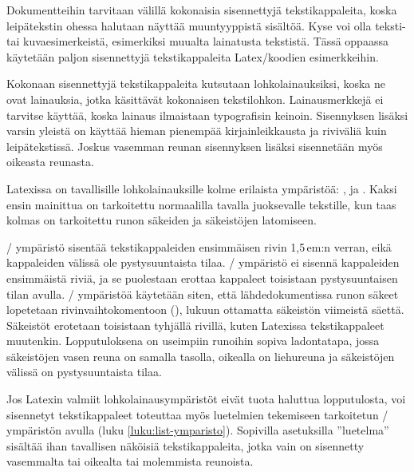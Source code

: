 Dokumentteihin tarvitaan välillä kokonaisia sisennettyjä
tekstikappaleita, koska leipätekstin ohessa halutaan näyttää
muuntyyppistä sisältöä. Kyse voi olla teksti- tai kuvaesimerkeistä,
esimerkiksi muualta lainatusta tekstistä. Tässä oppaassa käytetään
paljon sisennettyjä tekstikappaleita Latex\-/koodien esimerkkeihin.

Kokonaan sisennettyjä tekstikappaleita kutsutaan lohkolainauksiksi,
koska ne ovat lainauksia, jotka käsittävät kokonaisen tekstilohkon.
Lainausmerkkejä ei tarvitse käyttää, koska lainaus ilmaistaan
typografisin keinoin. Sisennyksen lisäksi varsin yleistä on käyttää
hieman pienempää kirjainleikkausta ja riviväliä kuin leipätekstissä.
Joskus vasemman reunan sisennyksen lisäksi sisennetään myös oikeasta
reunasta.

Latexissa on tavallisille lohkolainauksille kolme erilaista ympäristöä:
,  ja . Kaksi
ensin mainittua on tarkoitettu normaalilla tavalla juoksevalle
tekstille, kun taas kolmas on tarkoitettu runon säkeiden ja säkeistöjen
latomiseen.

\-/ ympäristö sisentää tekstikappaleiden
ensimmäisen rivin 1,5\,em:n verran, eikä kappaleiden välissä ole
pystysuuntaista tilaa. \-/ ympäristö ei sisennä
kappaleiden ensimmäistä riviä, ja se puolestaan erottaa kappaleet
toisistaan pystysuuntaisen tilan avulla. \-/ ympäristöä
käytetään siten, että lähdedokumentissa runon säkeet lopetetaan
rivinvaihtokomentoon (\komento{\keno}), lukuun ottamatta säkeistön
viimeistä säettä. Säkeistöt erotetaan toisistaan tyhjällä rivillä, kuten
Latexissa tekstikappaleet muutenkin. Lopputuloksena on useimpiin
runoihin sopiva ladontatapa, jossa säkeistöjen vasen reuna on samalla
tasolla, oikealla on liehureuna ja säkeistöjen välissä on
pystysuuntaista tilaa.

Jos Latexin valmiit lohkolainausympäristöt eivät tuota haluttua
lopputulosta, voi sisennetyt tekstikappaleet toteuttaa myös luetelmien
tekemiseen tarkoitetun \-/ ympäristön avulla (luku
\ref{luku:list-ymparisto}). Sopivilla asetuksilla ''luetelma'' sisältää
ihan tavallisen näköisiä tekstikappaleita, jotka vain on sisennetty
vasemmalta tai oikealta tai molemmista reunoista.

